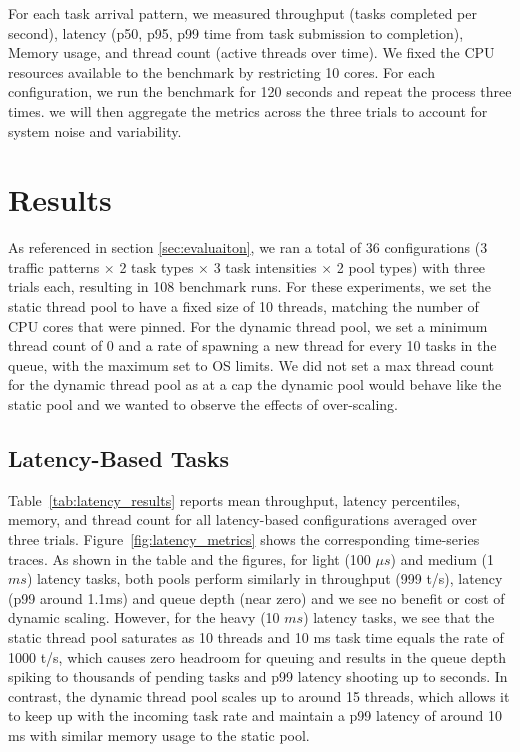 \documentclass[sigconf, 10pt]{acmart}
\begin{document}
For each task arrival pattern, we measured throughput (tasks completed per second), latency (p50, p95, p99 time from task submission to completion), Memory usage, and thread count (active threads over time). We fixed the CPU resources available to the benchmark by restricting 10 cores. For each configuration, we run the benchmark for 120 seconds and repeat the process three times.
we will then aggregate the metrics across the three trials to account for system noise and variability.

\section{Results}

As referenced in section \ref{sec:evaluaiton}, we ran a total of 36 configurations (3 traffic patterns $\times$ 2 task types $\times$ 3 task intensities $\times$ 2 pool types) with three trials each, resulting in 108 benchmark runs.
For these experiments, we set the static thread pool to have a fixed size of 10 threads, matching the number of CPU cores that were pinned.
For the dynamic thread pool, we set a minimum thread count of 0 and a rate of spawning a new thread for every 10 tasks in the queue, with the maximum set to OS limits.
We did not set a max thread count for the dynamic thread pool as at a cap the dynamic pool would behave like the static pool and we wanted to observe the effects of over-scaling.

\subsection{Latency-Based Tasks}

Table~\ref{tab:latency_results} reports mean throughput, latency percentiles, memory, and thread count for all latency-based configurations averaged over three trials.
Figure~\ref{fig:latency_metrics} shows the corresponding time-series traces.
As shown in the table and the figures, for light (100 $\mu s$) and medium (1 $ms$) latency tasks, both pools perform similarly in throughput (999 t/s), latency (p99 around 1.1ms) and queue depth (near zero) and we see no benefit or cost of dynamic scaling.
However, for the heavy (10 $ms$) latency tasks, we see that the static thread pool saturates as 10 threads and 10 ms task time equals the rate of 1000 t/s, which causes zero headroom for queuing and results in the queue depth spiking to thousands of pending tasks and p99 latency shooting up to seconds.
In contrast, the dynamic thread pool scales up to around 15 threads, which allows it to keep up with the incoming task rate and maintain a p99 latency of around 10 ms with similar memory usage to the static pool.
\end{document}
